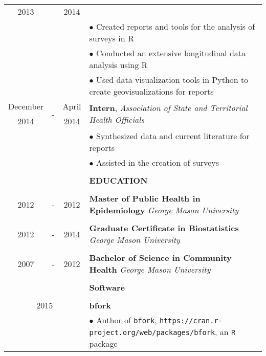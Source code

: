 \documentclass[10pt]{article}
\begin{document}
\begin{table}[ht]
\begin{tabular}{@{\hspace{0mm}}c@{\hspace{1mm}}c@{\hspace{3mm}}cl}
            2013 & & 2014 &\\
            & & & $\bullet$ Created reports and tools for the analysis of surveys in R\\
            & & & $\bullet$ Conducted an extensive longitudinal data analysis using R\\
            & & & $\bullet$ Used data visualization tools in Python to create geovisualizations for reports\\
            December & \multirow{2}{*}{-} & April & \multirow{2}{*}{\textbf{Intern}, \textit{Association of State and Territorial Health Officials}}\\
            2014 & & 2014 &\\
            & & & $\bullet$ Synthesized data and current literature for reports\\
            & & & $\bullet$ Assisted in the creation of surveys\\
            & & & \color{maroon}{\rule{14cm}{0.75pt}}\\
            & & & \large{\textbf{EDUCATION}}\\
            & & & \color{maroon}{\rule{14cm}{0.75pt}}\\
            2012 & - & 2012 & \textbf{Master of Public Health in Epidemiology} \textit{George Mason University}\\
            \\
            2012 & - & 2014 & \textbf{Graduate Certificate in Biostatistics} \textit{George Mason University}\\
            \\
            2007 & - & 2012 & \textbf{Bachelor of Science in Community Health} \textit{George Mason University}\\
            & & & \color{maroon}{\rule{14cm}{0.75pt}}\\
            & & & \large{\textbf{Software}}\\
            & & & \color{maroon}{\rule{14cm}{0.75pt}}\\
            \multicolumn{3}{c}{2015} & \textbf{bfork}\\
            & & & $\bullet$ Author of \texttt{bfork}, \texttt{https://cran.r-project.org/web/packages/bfork}, an \texttt{R} package\\

\end{tabular}
\end{table}
\end{document}
